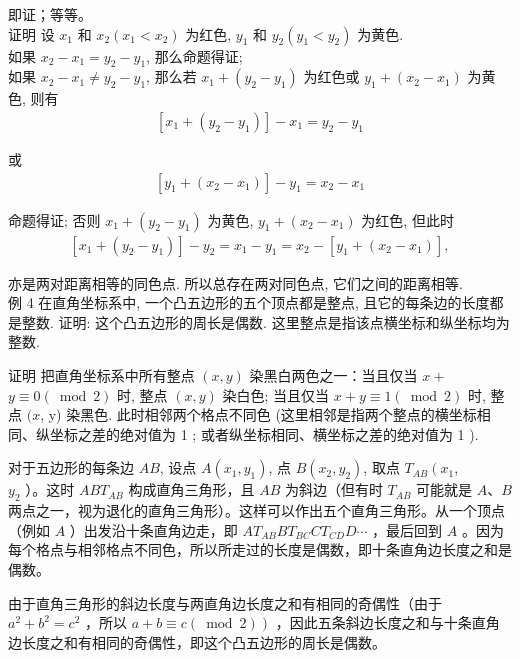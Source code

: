 \documentclass[10pt]{article}
\begin{document}
即证；等等。\\
证明 设 $x_{1}$ 和 $x_{2}\left(x_{1}<x_{2}\right)$ 为红色, $y_{1}$ 和 $y_{2}\left(y_{1}<y_{2}\right)$ 为黄色.\\
如果 $x_{2}-x_{1}=y_{2}-y_{1}$, 那么命题得证;\\
如果 $x_{2}-x_{1} \neq y_{2}-y_{1}$, 那么若 $x_{1}+\left(y_{2}-y_{1}\right)$ 为红色或 $y_{1}+\left(x_{2}-x_{1}\right)$ 为黄色, 则有\\
\begin{align*}
\left[x_{1}+\left(y_{2}-y_{1}\right)\right]-x_{1}=y_{2}-y_{1}
\end{align*}

或\\
\begin{align*}
\left[y_{1}+\left(x_{2}-x_{1}\right)\right]-y_{1}=x_{2}-x_{1}
\end{align*}

命题得证; 否则 $x_{1}+\left(y_{2}-y_{1}\right)$ 为黄色, $y_{1}+\left(x_{2}-x_{1}\right)$ 为红色, 但此时\\
\begin{align*}
\left[x_{1}+\left(y_{2}-y_{1}\right)\right]-y_{2}=x_{1}-y_{1}=x_{2}-\left[y_{1}+\left(x_{2}-x_{1}\right)\right],
\end{align*}

亦是两对距离相等的同色点. 所以总存在两对同色点, 它们之间的距离相等.\\
例 4 在直角坐标系中, 一个凸五边形的五个顶点都是整点, 且它的每条边的长度都是整数. 证明: 这个凸五边形的周长是偶数. 这里整点是指该点横坐标和纵坐标均为整数.

证明 把直角坐标系中所有整点 $(x, y)$ 染黑白两色之一：当且仅当 $x+$ $y \equiv 0(\bmod 2)$ 时, 整点 $(x, y)$ 染白色; 当且仅当 $x+y \equiv 1(\bmod 2)$ 时, 整点 $(x$, y) 染黑色. 此时相邻两个格点不同色 (这里相邻是指两个整点的横坐标相同、纵坐标之差的绝对值为 1 ; 或者纵坐标相同、横坐标之差的绝对值为 1 ).

对于五边形的每条边 $A B$, 设点 $A\left(x_{1}, y_{1}\right)$, 点 $B\left(x_{2}, y_{2}\right)$, 取点 $T_{A B}\left(x_{1}\right.$,\\
$y_{2}$ ）。这时 $A B T_{A B}$ 构成直角三角形，且 $A B$ 为斜边（但有时 $T_{A B}$ 可能就是 $A 、 B$两点之一，视为退化的直角三角形）。这样可以作出五个直角三角形。从一个顶点（例如 $A$ ）出发沿十条直角边走，即 $A T_{A B} B T_{B C} C T_{C D} D \cdots$ ，最后回到 $A$ 。因为每个格点与相邻格点不同色，所以所走过的长度是偶数，即十条直角边长度之和是偶数。

由于直角三角形的斜边长度与两直角边长度之和有相同的奇偶性（由于 $a^{2}+b^{2}=c^{2}$ ，所以 $\left.a+b \equiv c(\bmod 2)\right)$ ，因此五条斜边长度之和与十条直角边长度之和有相同的奇偶性，即这个凸五边形的周长是偶数。
\end{document}

